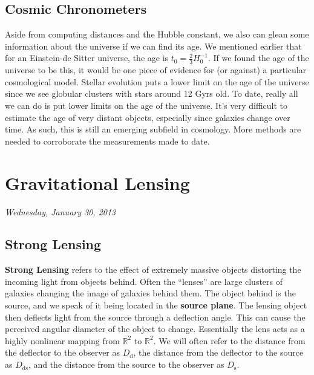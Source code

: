 \documentclass[10pt]{article}
\numberwithin{equation}{section}
\begin{document}
	\subsection{Cosmic Chronometers} %
	\label{sub:cosmic_chronometers}
	Aside from computing distances and the Hubble constant, we also can glean some information about the universe if we can find its age. We mentioned earlier that for an Einstein-de Sitter universe, the age is $t_0 = \frac{2}{3}H_0^{-1}$. If we found the age of the universe to be this, it would be one piece of evidence for (or against) a particular cosmological model. Stellar evolution puts a lower limit on the age of the universe since we see globular clusters with stars around 12 Gyrs old. To date, really all we can do is put lower limits on the age of the universe. It's very difficult to estimate the age of very distant objects, especially since galaxies change over time. As such, this is still an emerging subfield in cosmology. More methods are needed to corroborate the measurements made to date.
\section{Gravitational Lensing} %
\label{sec:gravitational_lensing}
	\textit{Wednesday, January 30, 2013}\\
	\subsection{Strong Lensing} %
	\label{sub:strong_lensing}
	\textbf{Strong Lensing} refers to the effect of extremely massive objects distorting the incoming light from objects behind. Often the ``lenses'' are large clusters of galaxies changing the image of galaxies behind them. The object behind is the source, and we speak of it being located in the \textbf{source plane}. The lensing object then deflects light from the source through a deflection angle. This can cause the perceived angular diameter of the object to change. Essentially the lens acts as a highly nonlinear mapping from $\mathbb{R}^2$ to $\mathbb{R}^2$. We will often refer to the distance from the deflector to the observer as $D_{\mathrm{d}}$, the distance from the deflector to the source as $D_{\mathrm{ds}}$, and the distance from the source to the observer as $D_{\mathrm{s}}$.\\
	
\end{document}
